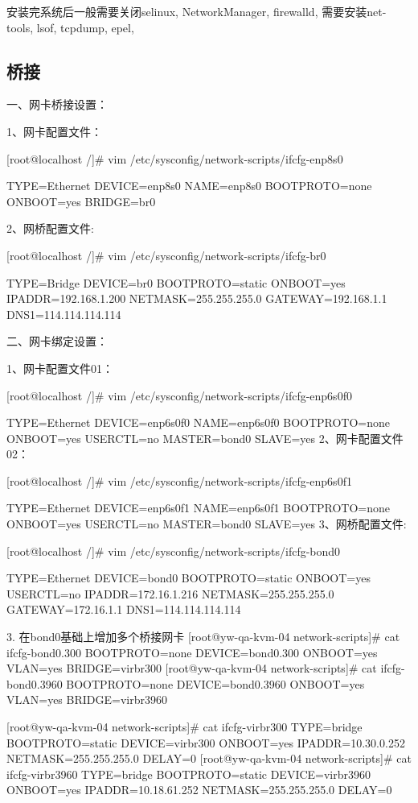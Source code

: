 安装完系统后一般需要关闭selinux, NetworkManager, firewalld, 需要安装net-tools, lsof, tcpdump, epel,

\subsection{桥接}

一、网卡桥接设置：

1、网卡配置文件：

[root@localhost /]# vim /etc/sysconfig/network-scripts/ifcfg-enp8s0

TYPE=Ethernet
DEVICE=enp8s0
NAME=enp8s0
BOOTPROTO=none
ONBOOT=yes
BRIDGE=br0

 2、网桥配置文件:

[root@localhost /]# vim /etc/sysconfig/network-scripts/ifcfg-br0

TYPE=Bridge
DEVICE=br0
BOOTPROTO=static
ONBOOT=yes
IPADDR=192.168.1.200
NETMASK=255.255.255.0
GATEWAY=192.168.1.1
DNS1=114.114.114.114


二、网卡绑定设置：

1、网卡配置文件01：

[root@localhost /]# vim /etc/sysconfig/network-scripts/ifcfg-enp6s0f0

TYPE=Ethernet
DEVICE=enp6s0f0
NAME=enp6s0f0
BOOTPROTO=none
ONBOOT=yes
USERCTL=no
MASTER=bond0
SLAVE=yes
2、网卡配置文件02：

[root@localhost /]# vim /etc/sysconfig/network-scripts/ifcfg-enp6s0f1

TYPE=Ethernet
DEVICE=enp6s0f1
NAME=enp6s0f1
BOOTPROTO=none
ONBOOT=yes
USERCTL=no
MASTER=bond0
SLAVE=yes
3、网桥配置文件:

[root@localhost /]# vim /etc/sysconfig/network-scripts/ifcfg-bond0

TYPE=Ethernet
DEVICE=bond0
BOOTPROTO=static
ONBOOT=yes
USERCTL=no
IPADDR=172.16.1.216
NETMASK=255.255.255.0
GATEWAY=172.16.1.1
DNS1=114.114.114.114

3. 在bond0基础上增加多个桥接网卡
[root@yw-qa-kvm-04 network-scripts]# cat ifcfg-bond0.300
BOOTPROTO=none
DEVICE=bond0.300
ONBOOT=yes
VLAN=yes
BRIDGE=virbr300
[root@yw-qa-kvm-04 network-scripts]# cat ifcfg-bond0.3960
BOOTPROTO=none
DEVICE=bond0.3960
ONBOOT=yes
VLAN=yes
BRIDGE=virbr3960

[root@yw-qa-kvm-04 network-scripts]# cat ifcfg-virbr300
TYPE=bridge
BOOTPROTO=static
DEVICE=virbr300
ONBOOT=yes
IPADDR=10.30.0.252
NETMASK=255.255.255.0
DELAY=0
[root@yw-qa-kvm-04 network-scripts]# cat ifcfg-virbr3960
TYPE=bridge
BOOTPROTO=static
DEVICE=virbr3960
ONBOOT=yes
IPADDR=10.18.61.252
NETMASK=255.255.255.0
DELAY=0


